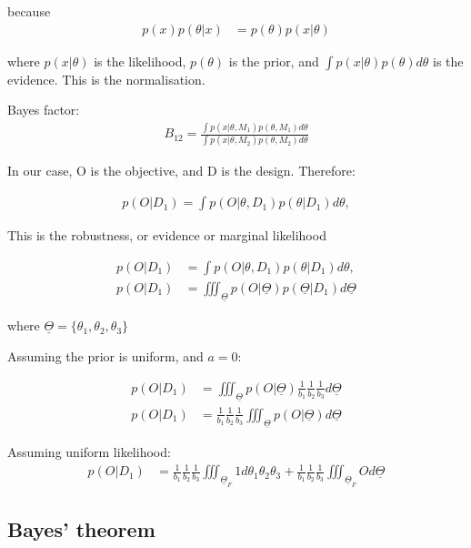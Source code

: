 because
\begin{align*}
p(x)p(\theta|x) &= p(\theta)p(x|\theta)
\end{align*}

where $p(x|\theta)$ is the likelihood, $p(\theta)$ is the prior, and $\displaystyle \int p(x|\theta)p(\theta)d\theta$ is the evidence. This is the normalisation. 

Bayes factor: 
\begin{align*}
B_{12} = \frac{\displaystyle \int p(x|\theta, M_1)p(\theta, M_1)d\theta}{\displaystyle \int p(x|\theta, M_2)p(\theta, M_2)d\theta}
\end{align*}


In our case, O is the objective, and D is the design. Therefore:

\begin{align*}
p(O|D_1) = \int p(O|\theta,D_1)p(\theta|D_1)d\theta,
\end{align*}



This is the robustness, or evidence or marginal likelihood

\begin{align*}
p(O|D_1) &= \displaystyle \int p(O|\theta,D_1)p(\theta|D_1)d\theta, \\
p(O|D_1) &= \displaystyle \iiint_{\underline{\Theta}} p(O|\underline{\Theta})p(\underline{\Theta}|D_1)d\underline{\Theta}
\end{align*}

where $\underline{\Theta} = \{ \theta_1, \theta_2,\theta_3 \}$ 

Assuming the prior is uniform, and $a=0$:

\begin{align*}
p(O|D_1) &= \displaystyle \iiint_{\underline{\Theta}} p(O|\underline{\Theta})\frac{1}{b_1}\frac{1}{b_2}\frac{1}{b_3}d\underline{\Theta} \\
p(O|D_1) &= \frac{1}{b_1}\frac{1}{b_2}\frac{1}{b_3} \displaystyle \iiint_{\underline{\Theta}}p(O|\underline{\Theta})d\underline{\Theta}
\end{align*}


Assuming uniform likelihood:
\begin{align*}
p(O|D_1) &= \frac{1}{b_1}\frac{1}{b_2}\frac{1}{b_3} \displaystyle \iiint_{\underline{\Theta}_F}1d\theta_1\theta_2\theta_3+\frac{1}{b_1}\frac{1}{b_2}\frac{1}{b_3} \displaystyle \iiint_{\underline{\Theta}_F}Od\underline{\Theta}
\end{align*}


\subsection{Bayes' theorem}
